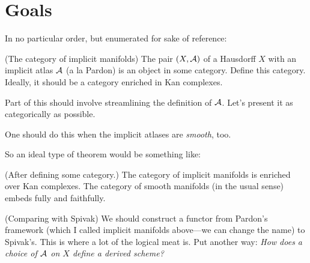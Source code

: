  

\section{Goals}
In no particular order, but enumerated for sake of reference:
\enum
	\item (The category of implicit manifolds)
		The pair $(X, \mathcal A)$ of a Hausdorff $X$ with an implicit atlas $\mathcal A$ (a la Pardon) is an object in some category. Define this category. Ideally, it should be a category enriched in Kan complexes.
			\enum
				\item
					Part of this should involve streamlining the definition of $\mathcal A$. Let's present it as categorically as possible.
				\item
					One should do this when the implicit atlases are {\em smooth}, too.
				\item
					So an ideal type of theorem would be something like:
						\begin{theorem}
						(After defining some category.) The category of implicit manifolds is enriched over Kan complexes. The category of smooth manifolds (in the usual sense) embeds fully and faithfully.
						\end{theorem}
				\item {}
			\enumd
	\item (Comparing with Spivak)
		We should construct a functor from Pardon's framework (which I called implicit manifolds above---we can change the name) to Spivak's. This is where a lot of the logical meat is. Put another way: {\em How does a choice of $\mathcal A$ on $X$ define a derived scheme?}
			\enum
				\item
